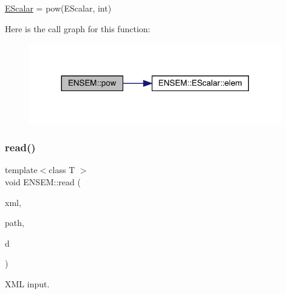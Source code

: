\mbox{\hyperlink{classENSEM_1_1EScalar}{E\+Scalar}} = pow(\+E\+Scalar, int) 

Here is the call graph for this function\+:
\nopagebreak
\begin{figure}[H]
\begin{center}
\leavevmode
\includegraphics[width=311pt]{d4/dca/group__escalar_gaba7571beee718548316367ab8d623e70_cgraph}
\end{center}
\end{figure}
\mbox{\label{group__escalar_ga5631206e233cf75b5fb2ff13ee8b77ac}} 
\subsubsection{\texorpdfstring{read()}{read()}}
{\footnotesize\ttfamily template$<$class T $>$ \\
void E\+N\+S\+E\+M\+::read (\begin{DoxyParamCaption}\item[{\mbox{\hyperlink{classADATXML_1_1XMLReader}{A\+D\+A\+T\+X\+M\+L\+::\+X\+M\+L\+Reader}} \&}]{xml,  }\item[{const std\+::string \&}]{path,  }\item[{\mbox{\hyperlink{classENSEM_1_1EScalar}{E\+Scalar}}$<$ T $>$ \&}]{d }\end{DoxyParamCaption})\hspace{0.3cm}{\ttfamily [inline]}}



X\+ML input. 

